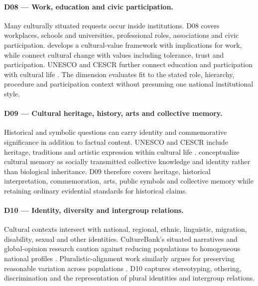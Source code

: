 \paragraph{D08 --- Work, education and civic participation.}
Many culturally situated requests occur inside institutions. D08 covers workplaces, schools and universities, professional roles, associations and civic participation. \textcite{schwartz1999culturalvalues} develops a cultural-value framework with implications for work, while \textcite{inglehartbaker2000modernization} connect cultural change with values including tolerance, trust and participation. UNESCO and CESCR further connect education and participation with cultural life \parencite{unesco2001culturaldiversity,cescr2009gc21}. The dimension evaluates fit to the stated role, hierarchy, procedure and participation context without presuming one national institutional style.

\paragraph{D09 --- Cultural heritage, history, arts and collective memory.}
Historical and symbolic questions can carry identity and commemorative significance in addition to factual content. UNESCO and CESCR include heritage, traditions and artistic expression within cultural life \parencite{unesco2001culturaldiversity,cescr2009gc21}. \textcite{assmann1995collective} conceptualize cultural memory as socially transmitted collective knowledge and identity rather than biological inheritance. D09 therefore covers heritage, historical interpretation, commemoration, arts, public symbols and collective memory while retaining ordinary evidential standards for historical claims.

\paragraph{D10 --- Identity, diversity and intergroup relations.}
Cultural contexts intersect with national, regional, ethnic, linguistic, migration, disability, sexual and other identities. CultureBank's situated narratives and global-opinion research caution against reducing populations to homogeneous national profiles \parencite{shi2024culturebank,durmus2023globalopinionqa}. Pluralistic-alignment work similarly argues for preserving reasonable variation across populations \parencite{sorensen2024pluralistic}. D10 captures stereotyping, othering, discrimination and the representation of plural identities and intergroup relations.

